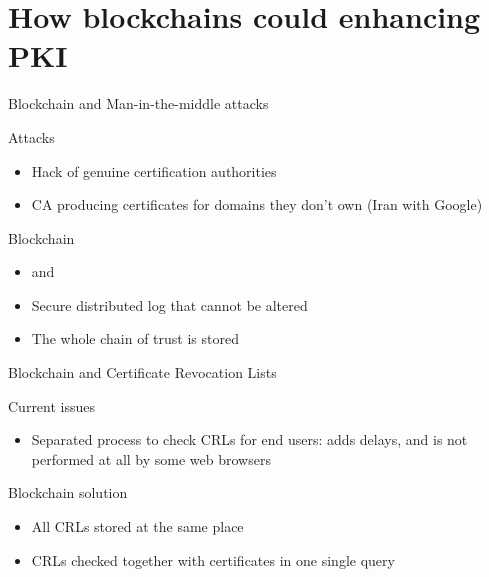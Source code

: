 \section[Blockchains for PKI]{How blockchains could enhancing PKI}

\begin{frame}{Blockchain and Man-in-the-middle attacks}
	\begin{alertblock}{Attacks}
		\begin{itemize}
			\item Hack of genuine certification authorities
			\item CA producing certificates for domains they don't own (Iran with Google)
		\end{itemize}
	\end{alertblock}

	\begin{exampleblock}{Blockchain}
		\begin{itemize}
			\item {} and 
			\item Secure distributed log that cannot be altered
			\item The whole chain of trust is stored
		\end{itemize}
	\end{exampleblock}
\end{frame}

\begin{frame}{Blockchain and Certificate Revocation Lists}
	\begin{alertblock}{Current issues}
		\begin{itemize}
			\item Separated process to check CRLs for end users: adds delays, and is not performed at all by some web browsers
		\end{itemize}
	\end{alertblock}

	\begin{exampleblock}{Blockchain solution}
		\begin{itemize}
			\item All CRLs stored at the same place
			\item CRLs checked together with certificates in one single query
		\end{itemize}
	\end{exampleblock}
\end{frame}

